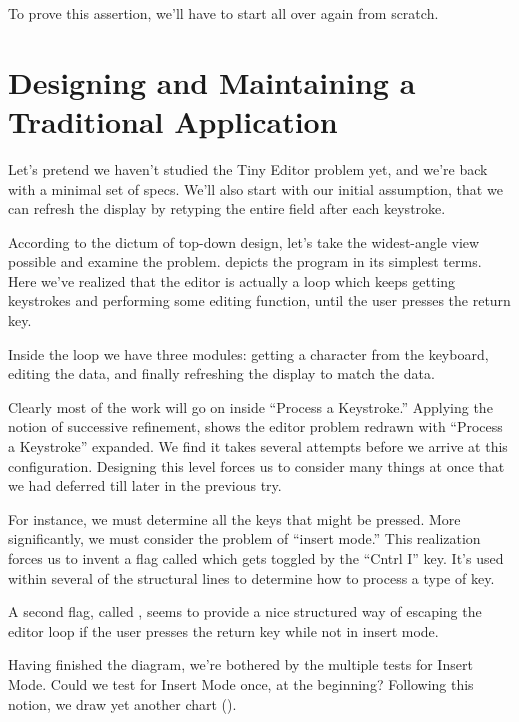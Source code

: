 To prove this assertion, we'll have to start all over again from
scratch.

\section{Designing and Maintaining a Traditional Application}

Let's pretend we haven't studied the Tiny Editor problem yet, and
we're back with a minimal set of specs. We'll also start with our
initial assumption, that we can refresh the display by retyping the
entire field after each keystroke.

According to the dictum of top-down design, let's take the
widest-angle view possible and examine the problem.  
depicts the program in its simplest terms. Here we've realized that
the editor is actually a loop which keeps getting keystrokes and
performing some editing function, until the user presses the return
key.

Inside the loop we have three modules: getting a character from the
keyboard, editing the data, and finally refreshing the display to match
the data.

Clearly most of the work will go on inside ``Process a Keystroke.''
Applying the notion of successive refinement,  shows the
editor problem redrawn with ``Process a Keystroke'' expanded. We find it
takes several attempts before we arrive at this configuration. Designing
this level forces us to consider many things at once that we had deferred
till later in the previous try.


For instance, we must determine all the keys that might be pressed.
More significantly, we must consider the problem of ``insert mode.'' This
realization forces us to invent a flag called  which gets
toggled by the ``Cntrl I'' key. It's used within several of the structural
lines to determine how to process a type of key.

A second flag, called , seems to provide a nice structured
way of escaping the editor loop if the user presses the return key while
not in insert mode.

Having finished the diagram, we're bothered by the multiple tests
for Insert Mode. Could we test for Insert Mode once, at the beginning?
Following this notion, we draw yet another chart ().

